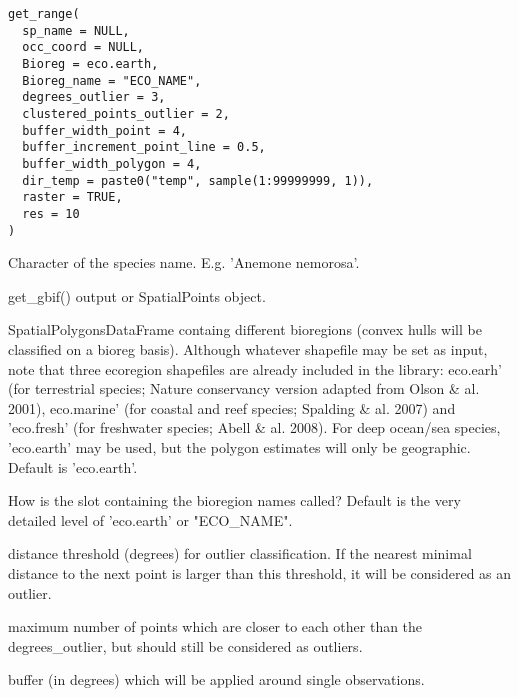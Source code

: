 \documentclass[a4paper]{book}
\begin{document}
%
\begin{Usage}
\begin{verbatim}
get_range(
  sp_name = NULL,
  occ_coord = NULL,
  Bioreg = eco.earth,
  Bioreg_name = "ECO_NAME",
  degrees_outlier = 3,
  clustered_points_outlier = 2,
  buffer_width_point = 4,
  buffer_increment_point_line = 0.5,
  buffer_width_polygon = 4,
  dir_temp = paste0("temp", sample(1:99999999, 1)),
  raster = TRUE,
  res = 10
)
\end{verbatim}
\end{Usage}
%
\begin{Arguments}
\begin{ldescription}
\item[\code{sp\_name}] Character of the species name. E.g. 'Anemone nemorosa'.

\item[\code{occ\_coord}] get\_gbif() output or SpatialPoints object.

\item[\code{Bioreg}] SpatialPolygonsDataFrame containg different bioregions (convex hulls will
be classified on a bioreg basis). Although whatever shapefile may be set as input, note
that three ecoregion shapefiles are already included in the library: eco.earh' (for
terrestrial species; Nature conservancy version adapted from Olson \& al. 2001), eco.marine'
(for coastal and reef species; Spalding \& al. 2007) and 'eco.fresh' (for freshwater species;
Abell \& al. 2008). For deep ocean/sea species, 'eco.earth' may be used, but the polygon
estimates will only be geographic. Default is 'eco.earth'.

\item[\code{Bioreg\_name}] How is the slot containing the bioregion names called? Default is the
very detailed level of 'eco.earth' or "ECO\_NAME".

\item[\code{degrees\_outlier}] distance threshold (degrees) for outlier classification. If the
nearest minimal distance to the next point is larger than this threshold, it will be
considered as an outlier.

\item[\code{clustered\_points\_outlier}] maximum number of points which are closer to each other
than the degrees\_outlier, but should still be considered as outliers.

\item[\code{buffer\_width\_point}] buffer (in degrees) which will be applied around single observations.


\end{ldescription}
\end{Arguments}
\end{document}
